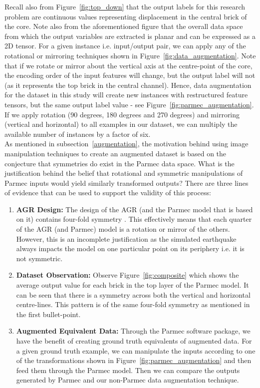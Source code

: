 \noindent
Recall also from Figure~\ref{fig:top_down} that the output labels for this research problem are continuous values representing displacement in the central brick of the core. Note also from the aforementioned figure that the overall data space from which the output variables are extracted is planar and can be expressed as a 2D tensor. For a given instance i.e. input/output  pair, we can apply any of the rotational or mirroring techniques shown in Figure~\ref{fig:data_augmentation}. Note that if we rotate or mirror about the vertical axis at the centre-point of the core, the encoding order of the input features will change, but the output label will not (as it represents the top brick in the central channel). Hence, data augmentation for the dataset in this study will create new instances with restructured feature tensors, but the same output label value - see Figure~\ref{fig:parmec_augmentation}. 
\\

\noindent
If we apply rotation (90 degrees, 180 degrees and 270 degrees) and mirroring (vertical and horizontal) to all examples in our dataset, we can multiply the available number of instances by a factor of six. 
\\

\noindent
As mentioned in subsection~\ref{augmentation}, the motivation behind using image manipulation techniques to create an augmented dataset is based on the conjecture that symmetries do exist in the Parmec data space. What is the justification behind the belief that rotational and symmetric manipulations of Parmec inputs would yield similarly transformed outputs? There are three lines of evidence that can be used to support the validity of this process:
\\

\begin{enumerate}
	\item \textbf{AGR Design:} The design of the AGR (and the Parmec model that is based on it) contains four-fold symmetry \cite{nonbol1996description}. This effectively means that each quarter of the AGR (and Parmec) model is a rotation or mirror of the others. However, this is an incomplete justification as the simulated earthquake always impacts the model on one particular point on its periphery i.e. it is not symmetric.
	\item \textbf{Dataset Observation:} Observe Figure~\ref{fig:composite} which shows the average output value for each brick in the top layer of the Parmec model. It can be seen that there is a symmetry across both the vertical and horizontal centre-lines. This pattern is of the same four-fold symmetry as mentioned in the first bullet-point.
	\item \textbf{Augmented Equivalent Data:} Through the Parmec software package, we have the benefit of creating ground truth equivalents of augmented data. For a given ground truth example, we can manipulate the inputs according to one of the transformations shown in Figure~\ref{fig:parmec_augmentation} and then feed them through the Parmec model. Then we can compare the outputs generated by Parmec and our non-Parmec data augmentation technique.  
	
\end{enumerate}

